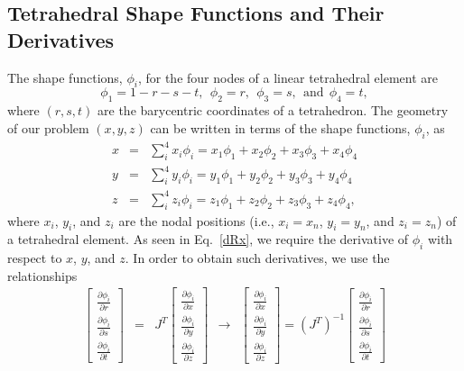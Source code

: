 \subsection{Tetrahedral Shape Functions and Their Derivatives}
The shape functions, $\phi_i$, for the four nodes of a linear tetrahedral element are
%
\begin{equation}
\phi_1 = 1 - r - s - t, \ \ \phi_2 = r, \ \ \phi_3 = s, \ \ \text{and} \ \ \phi_4 = t,
\label{shape_fxns}
\end{equation}
%
where $(r,s,t)$ are the barycentric coordinates of a tetrahedron. The geometry of our problem $(x,y,z)$ can be written in terms of the shape functions, $\phi_i$, as
%
\begin{eqnarray}
x &=& \sum_{i}^4 x_i \phi_i = x_1 \phi_1 + x_2 \phi_2 + x_3 \phi_3 + x_4 \phi_4 \nonumber\\
y &=& \sum_i^4 y_i \phi_i =  y_1 \phi_1 + y_2 \phi_2 + y_3 \phi_3 + y_4 \phi_4  \nonumber\\
z &=& \sum_i^4  z_i \phi_i =  z_1 \phi_1 + z_2 \phi_2 + z_3 \phi_3 + z_4 \phi_4 ,
\label{geometry}
\end{eqnarray}
%
where $x_i$, $y_i$, and $z_i$ are the nodal positions (i.e., $x_i = x_n$, $y_i = y_n$, and $z_i = z_n$) of a tetrahedral element. As seen in Eq.\ \eqref{dRx}, we require the derivative of $\phi_i$ with respect to $x$, $y$, and $z$. In order to obtain such derivatives, we use the relationships
%
\begin{eqnarray}
%
\begin{bmatrix}
\frac{\partial \phi_i}{\partial r} \\
\frac{\partial \phi_i}{\partial s} \\
\frac{\partial \phi_i}{\partial t}
\end{bmatrix} &=&
%
J^T
%
\begin{bmatrix}
\frac{\partial \phi_i}{\partial x} \\
\frac{\partial \phi_i}{\partial y} \\
\frac{\partial \phi_i}{\partial z}
\end{bmatrix} \ \ \rightarrow \ \ 
%
%
\begin{bmatrix}
\frac{\partial \phi_i}{\partial x} \\
\frac{\partial \phi_i}{\partial y} \\
\frac{\partial \phi_i}{\partial z}
\end{bmatrix} =
%
(J^T)^{-1}
%
\begin{bmatrix}
\frac{\partial \phi_i}{\partial r} \\
\frac{\partial \phi_i}{\partial s} \\
\frac{\partial \phi_i}{\partial t}
\end{bmatrix}
\label{dx_to_dr}
\end{eqnarray}
